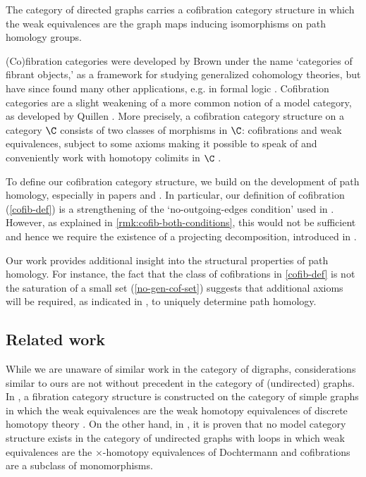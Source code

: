 \begin{theorem*}
  The category of directed graphs carries a cofibration category structure in which the weak equivalences are the graph maps inducing isomorphisms on path homology groups.
\end{theorem*}

(Co)fibration categories were developed by Brown \cite{brown:abstract-homotopy-theory} under the name `categories of fibrant objects,' as a framework for studying generalized cohomology theories, but have since found many other applications, e.g. in formal logic \cite{avigad-kapulkin-lumsdaine}.
Cofibration categories are a slight weakening of a more common notion of a model category, as developed by Quillen \cite{quillen:book}.
More precisely, a cofibration category structure on a category $\C$ consists of two classes of morphisms in $\C$: cofibrations and weak equivalences, subject to some axioms making it possible to speak of and conveniently work with homotopy colimits in $\C$ \cite{szumilo:two-models,kapulkin-szumilo}.

To define our cofibration category structure, we build on the development of path homology, especially in papers \cite{grigor'yan-jimenez-muranov-yau} and \cite{grigor'yan-muranov-yau}.
In particular, our definition of cofibration (\cref{cofib-def}) is a strengthening of the `no-outgoing-edges condition' used in \cite[\S5]{grigor'yan-jimenez-muranov-yau}.
However, as explained in \cref{rmk:cofib-both-conditions}, this would not be sufficient and hence we require the existence of a projecting decomposition, introduced in \cite{leinster:magnitude-graph}.

Our work provides additional insight into the structural properties of path homology.
For instance, the fact that the class of cofibrations in \cref{cofib-def} is not the saturation of a small set (\cref{no-gen-cof-set}) suggests that additional axioms will be required, as indicated in \cite[Rmk.~5.3]{grigor'yan-jimenez-muranov-yau}, to uniquely determine path homology.

\subsection{Related work}
While we are unaware of similar work in the category of digraphs, considerations similar to ours are not without precedent in the category of (undirected) graphs.
In \cite{carranza-kapulkin:cubical-setting}, a fibration category structure is constructed on the category of simple graphs in which the weak equivalences are the weak homotopy equivalences of discrete homotopy theory \cite{babson-barcelo-longueville-laubenbacher}.
On the other hand, in \cite{goyal-santhanam}, it is proven that no model category structure exists in the category of undirected graphs with loops in which weak equivalences are the $\times$-homotopy equivalences of Dochtermann \cite{dochtermann} and cofibrations are a subclass of monomorphisms.

